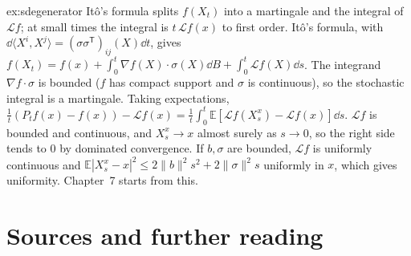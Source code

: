 \begin{solution}{ex:sdegenerator}
\idea It\^o's formula splits $f(X_t)$ into a martingale and the integral of $\mathcal Lf$; at small times the integral is $t\,\mathcal Lf(x)$ to first order.
\writeup It\^o's formula, with $\dd\langle X^i,X^j\rangle=(\sigma\sigma^{\mathsf T})_{ij}(X)\dd t$, gives $f(X_t)=f(x)+\int_0^t\nabla f(X)\cdot\sigma(X)\dd B+\int_0^t\mathcal Lf(X)\dd s$. The integrand $\nabla f\cdot\sigma$ is bounded
($f$ has compact support and $\sigma$ is continuous), so the stochastic integral is a martingale. Taking expectations, $\frac1t(P_tf(x)-f(x))-\mathcal Lf(x)=\frac1t\int_0^t\mathbb E[\mathcal Lf(X^x_s)-\mathcal Lf(x)]\dd s$. $\mathcal Lf$ is
bounded and continuous, and $X^x_s\to x$ almost surely as $s\to0$, so the right side tends to $0$ by dominated convergence. If $b,\sigma$ are bounded, $\mathcal Lf$ is uniformly continuous and
$\mathbb E|X^x_s-x|^2\le2\|b\|^2s^2+2\|\sigma\|^2s$ uniformly in $x$, which gives uniformity. Chapter~7 starts from this.
\end{solution}

\section*{Sources and further reading}

